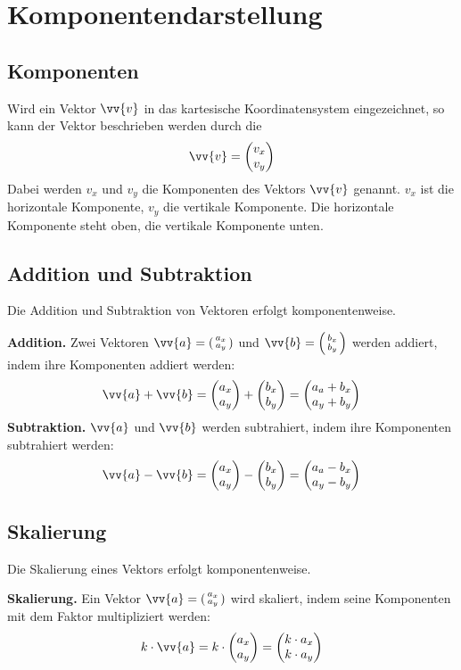 \newpage
\section{Komponentendarstellung}

\subsection{Komponenten}

Wird ein Vektor $\vv{v}$ in das kartesische Koordinatensystem eingezeichnet, so kann der Vektor beschrieben werden durch die
\[
  \vv{v} = \dvec{v_{x},v_{y}}
\]
Dabei werden $v_{x}$ und $v_{y}$ die Komponenten des Vektors $\vv{v}$ genannt. $v_{x}$ ist die horizontale Komponente, $v_{y}$ die vertikale Komponente. Die horizontale Komponente steht oben, die vertikale Komponente unten.

\subsection{Addition und Subtraktion}
Die Addition und Subtraktion von Vektoren erfolgt komponentenweise.

\begin{theorem}
  \textbf{Addition.} Zwei Vektoren $\vv{a} = \tvec{a_{x},a_{y}}$ und $\vv{b} = \tvec{b_{x},b_{y}}$ werden addiert, indem ihre Komponenten addiert werden:
  \[
    \vv{a}+\vv{b} = \dvec{a_{x},a_{y}}+\dvec{b_{x},b_{y}} = \dvec{a_{a}+b_{x},a_{y}+b_{y}}
  \]
  \textbf{Subtraktion.} $\vv{a}$ und $\vv{b}$ werden subtrahiert, indem ihre Komponenten subtrahiert werden:
  \[
    \vv{a}-\vv{b} = \dvec{a_{x},a_{y}}-\dvec{b_{x},b_{y}} = \dvec{a_{a}-b_{x},a_{y}-b_{y}}
  \]

\end{theorem}

\subsection{Skalierung}

Die Skalierung eines Vektors erfolgt komponentenweise.

\begin{theorem}
  \textbf{Skalierung.} Ein Vektor  $\vv{a} = \tvec{a_{x},a_{y}}$ wird skaliert, indem seine Komponenten mit dem Faktor multipliziert werden:
  \[
    k\cdot\vv{a} = k\cdot\dvec{a_{x},a_{y}} = \dvec{k\cdot a_{x},k\cdot a_{y}}
  \]
\end{theorem}

